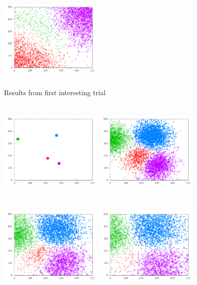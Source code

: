 \begin{figure}
    \includegraphics[width=5cm,height=5cm]{Trial1-25000.png}
    \caption{Results from first interesting trial}
\end{figure}

\begin{figure}
\centering
    \includegraphics[width=5cm,height=5cm]{Trial2-0.png}
    \includegraphics[width=5cm,height=5cm]{Trial2-5000.png}
    \includegraphics[width=5cm,height=5cm]{Trial2-10000.png}
    \includegraphics[width=5cm,height=5cm]{Trial2-15000.png}

\end{figure}
